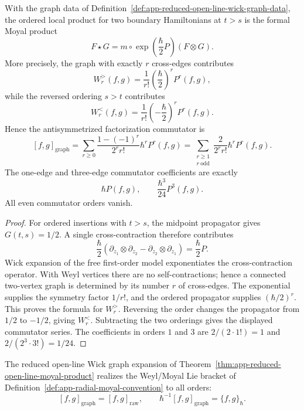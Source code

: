 \begin{thm}
\label{thm:app-reduced-open-line-moyal-product}
  With the graph data of
  Definition~\ref{def:app-reduced-open-line-wick-graph-data}, the
  ordered local product for two boundary Hamiltonians at \(t>s\) is
  the formal Moyal product
  \[
    F\star G=m\circ\exp\left(\frac{\hbar}{2}P\right)(F\otimes G).
  \]
  More precisely, the graph with exactly \(r\) cross-edges contributes
  \[
    W_r^{>}(f,g)
      =
    \frac{1}{r!}\left(\frac{\hbar}{2}\right)^rP^r(f,g),
  \]
  while the reversed ordering \(s>t\) contributes
  \[
    W_r^{<}(f,g)
      =
    \frac{1}{r!}\left(-\frac{\hbar}{2}\right)^rP^r(f,g).
  \]
  Hence the antisymmetrized factorization commutator is
  \[
    [f,g]_{\mathrm{graph}}
      =
    \sum_{r\geq0}
      \frac{1-(-1)^r}{2^r r!}\hbar^rP^r(f,g)
      =
    \sum_{\substack{r\geq1\\r\ \mathrm{odd}}}
      \frac{2}{2^r r!}\hbar^rP^r(f,g).
  \]
  The one-edge and three-edge commutator coefficients are exactly
  \[
    \hbar P(f,g),\qquad \frac{\hbar^3}{24}P^3(f,g).
  \]
  All even commutator orders vanish.
\end{thm}

\begin{proof}
  For ordered insertions with \(t>s\), the midpoint propagator gives
  \(G(t,s)=1/2\).  A single cross-contraction therefore contributes
  \[
    \frac{\hbar}{2}
    \left(\partial_{z_1}\otimes\partial_{z_2}
      -\partial_{z_2}\otimes\partial_{z_1}\right)
    =\frac{\hbar}{2}P.
  \]
  Wick expansion of the free first-order model exponentiates the
  cross-contraction operator.  With Weyl vertices there are no
  self-contractions; hence a connected two-vertex graph is determined
  by its number \(r\) of cross-edges.  The exponential supplies the
  symmetry factor \(1/r!\), and the ordered propagator supplies
  \((\hbar/2)^r\).  This proves the formula for \(W_r^{>}\).  Reversing
  the order changes the propagator from \(1/2\) to \(-1/2\), giving
  \(W_r^{<}\).  Subtracting the two orderings gives the displayed
  commutator series.  The coefficients in orders \(1\) and \(3\) are
  \(2/(2\cdot1!)=1\) and \(2/(2^3\cdot3!)=1/24\).
\end{proof}

\begin{cor}
\label{cor:app-reduced-graph-realizes-moyal}
  The reduced open-line Wick graph expansion of
  Theorem~\ref{thm:app-reduced-open-line-moyal-product} realizes the
  Weyl/Moyal Lie bracket of
  Definition~\ref{def:app-radial-moyal-convention} to all orders:
  \[
    [f,g]_{\mathrm{graph}}=[f,g]_{\mathrm{raw}},\qquad
    \hbar^{-1}[f,g]_{\mathrm{graph}}=\{f,g\}_\hbar .
  \]
\end{cor}

